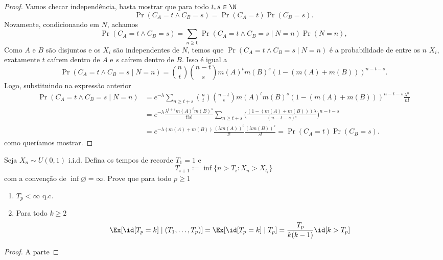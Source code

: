 \begin{proof}
	Vamos checar independência, basta mostrar que para todo $t,s \in \N$
	\[
		\Pr(C_A = t \land C_B = s) = \Pr(C_A = t)\Pr(C_B = s).
	\]
	Novamente, condicionando em $N$, achamos 
	\[
		\Pr(C_A = t \land C_B = s) = \sum_{n \geq 0} \Pr(C_A = t \land C_B = s \mid N = n) \Pr(N = n),
	\]
	Como $A$ e $B$ são disjuntos e os $X_i$ são independentes de $N$, temos que $\Pr(C_A = t \land C_B = s \mid N = n)$ é a probabilidade
	de entre os $n$ $X_i$, exatamente $t$ caírem dentro de $A$ e $s$ caírem dentro de $B$. Isso é igual a
	\[
		\Pr(C_A = t \land C_B = s \mid N = n) = \binom{n}{t} \binom{n - t}{s}m(A)^t m(B)^s (1 - (m(A) + m(B)))^{n - t - s}.
	\]
	Logo, substituindo na expressão anterior
	\begin{align*}
		\Pr(C_A = t \land C_B = s \mid N = n) &= e^{-\lambda} \sum_{n \geq t + s}  \binom{n}{t} \binom{n - t}{s}m(A)^t m(B)^s (1 - (m(A) + m(B)))^{n - t - s} \frac{\lambda^n}{n!}\\
		&= e^{-\lambda} \frac{\lambda^{t+s} m(A)^t m(B)^s}{t!s!} \sum_{n \geq t + s}\bigg(\frac{(1 - (m(A) + m(B))) \lambda}{(n-t-s)!}\bigg)^{n-t-s}\\
		&= e^{-\lambda(m(A) + m(B))}\frac{(\lambda m(A))^t}{t!} \frac{(\lambda m(B))^s}{s!} = \Pr(C_A = t) \Pr(C_B = s).
	\end{align*}
	como queríamos mostrar.
\end{proof}

\begin{exercise}
	Seja $X_n \sim U(0,1)$ i.i.d. Defina os tempos de recorde $T_1 = 1$ e 
	\[
		T_{i+1} := \inf \{n > T_i : X_n > X_{t_i}\}
	\]
	com a convenção de $\inf \varnothing = \infty$. Prove que para todo $p \geq 1$
	\begin{enumerate}[label=(\alph*)]
		\item $T_p < \infty$ q.c.
		\item Para todo $k \geq 2$
		\[
			\Ex[\id[T_p = k] \mid (T_1, \dots, T_p)] = \Ex[\id[T_p = k] \mid T_p] = \frac{T_p}{k(k-1)}\id[k > T_p]
		\]
	\end{enumerate}
\end{exercise}
\begin{proof}
	A parte 
\end{proof}